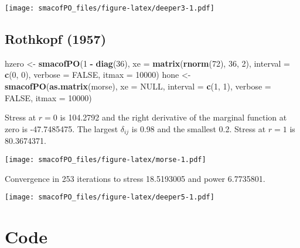 \documentclass[
  12pt,
]{article}
\newenvironment{Shaded}{\begin{snugshade}}{\end{snugshade}}
\newcommand{\AttributeTok}[1]{\textcolor[rgb]{0.13,0.29,0.53}{#1}}
\newcommand{\ConstantTok}[1]{\textcolor[rgb]{0.56,0.35,0.01}{#1}}
\newcommand{\DecValTok}[1]{\textcolor[rgb]{0.00,0.00,0.81}{#1}}
\newcommand{\FunctionTok}[1]{\textcolor[rgb]{0.13,0.29,0.53}{\textbf{#1}}}
\newcommand{\NormalTok}[1]{#1}
\newcommand{\OtherTok}[1]{\textcolor[rgb]{0.56,0.35,0.01}{#1}}
\newcommand{\SpecialCharTok}[1]{\textcolor[rgb]{0.81,0.36,0.00}{\textbf{#1}}}
\begin{document}
\texttt{[image: smacofPO\_files/figure-latex/deeper3-1.pdf]}

\subsection{Rothkopf (1957)}\label{rothkopf_57}

\begin{Shaded}
\begin{Highlighting}[]
\NormalTok{hzero }\OtherTok{\textless{}{-}} \FunctionTok{smacofPO}\NormalTok{(}\DecValTok{1} \SpecialCharTok{{-}} \FunctionTok{diag}\NormalTok{(}\DecValTok{36}\NormalTok{), }\AttributeTok{xe =} \FunctionTok{matrix}\NormalTok{(}\FunctionTok{rnorm}\NormalTok{(}\DecValTok{72}\NormalTok{), }\DecValTok{36}\NormalTok{, }\DecValTok{2}\NormalTok{), }\AttributeTok{interval =} \FunctionTok{c}\NormalTok{(}\DecValTok{0}\NormalTok{, }\DecValTok{0}\NormalTok{), }\AttributeTok{verbose =} \ConstantTok{FALSE}\NormalTok{, }\AttributeTok{itmax =} \DecValTok{10000}\NormalTok{)}
\NormalTok{hone }\OtherTok{\textless{}{-}} \FunctionTok{smacofPO}\NormalTok{(}\FunctionTok{as.matrix}\NormalTok{(morse), }\AttributeTok{xe =} \ConstantTok{NULL}\NormalTok{, }\AttributeTok{interval =} \FunctionTok{c}\NormalTok{(}\DecValTok{1}\NormalTok{, }\DecValTok{1}\NormalTok{), }\AttributeTok{verbose =} \ConstantTok{FALSE}\NormalTok{, }\AttributeTok{itmax =} \DecValTok{10000}\NormalTok{)}
\end{Highlighting}
\end{Shaded}

Stress at \(r=0\) is 104.2792 and the right derivative of the marginal function at zero is -47.7485475. The largest \(\delta_{ij}\) is 0.98 and the smallest 0.2. Stress at \(r=1\) is 80.3674371.

\texttt{[image: smacofPO\_files/figure-latex/morse-1.pdf]}

Convergence in 253 iterations to stress 18.5193005 and power 6.7735801.

\texttt{[image: smacofPO\_files/figure-latex/deeper5-1.pdf]}

\section{Code}\label{code}
\end{document}
